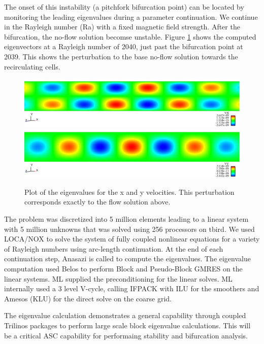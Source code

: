 \documentclass[pdf,ps2pdf,11pt]{SANDreport}
\begin{document}
The onset of this instability (a pitchfork bifurcation point) can be located
by monitoring the leading eigenvalues during a parameter continuation.  We
continue in the Rayleigh number (Ra) with a fixed magnetic field strength.
After the bifurcation, the no-flow solution becomse unstable. Figure
\ref{fig:hrbEigenvalues} shows the computed eigenvectors at a Rayleigh number
of 2040, just past the bifurcation point at 2039.  This shows the perturbation
to the base no-flow solution towards the recirculating cells.

{\bsinglespace
\begin{figure}
\begin{center}
\includegraphics*[angle=0,scale=0.30]{figures/ms_eigenvalue_vx.eps}
\includegraphics*[angle=0,scale=0.30]{figures/ms_eigenvalue_vy.eps}
\end{center}
\caption[Eigenvalues for the hydromagnetic Rayleigh-Bernard problem]{
\label{fig:hrbEigenvalues}
Plot of the eigenvalues for the x and y velocities.  This perturbation
corresponds exactly to the flow solution above.}
\end{figure}
\esinglespace}
 
The problem was discretized into 5 million elements leading to a linear system
with 5 million unknowns that was solved using 256 processors on tbird.  We
used LOCA/NOX to solve the system of fully coupled nonlinear equations for a
variety of Rayleigh numbers using arc-length continuation.  At the end of each
continuation step, Anasazi is called to compute the eigenvalues.  The
eigenvalue computation used Belos to perform Block and Pseudo-Block GMRES on
the linear systems.  ML supplied the preconditioning for the linear solves.
ML internally used a 3 level V-cycle, calling IFPACK with ILU for the
smoothers and Amesos (KLU) for the direct solve on the coarse grid.

The eigenvalue calculation demonstrates a general capability through coupled
Trilinos packages to perform large scale block eigenvalue calculations.  This
will be a critical ASC capability for performaing stability and bifurcation
analysis.
\end{document}
